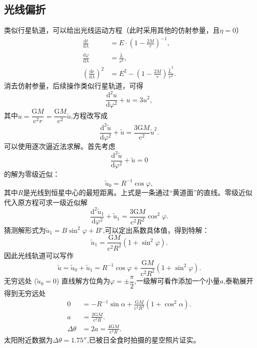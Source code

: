 \documentclass[11pt, a4paper, oneside, onecolumn]{ctexart}
\numberwithin{equation}{subsection}
\begin{document}
\subsection{光线偏折}
类似行星轨道，可以给出光线运动方程（此时采用其他的仿射参量，且$\eta=0$）
\begin{align}
\frac{\mathrm{d}t}{\mathrm{d}\lambda}&=E\cdot\left(1-\frac{2M}{r}\right)^{-1},\\
\frac{\mathrm{d}\varphi}{\mathrm{d}\lambda}&=\frac{\widetilde{L}}{r^{2}},\\
\left(\frac{\mathrm{d}r}{\mathrm{d}\lambda}\right)^{2}&=E^{2}-\left(1-\frac{2M}{r}\right)\frac{\widetilde{L}^{2}}{r^{2}}.
\end{align}
消去仿射参量，后续操作类似行星轨道，可得
\begin{equation}
\frac{\mathrm{d}^{2}u}{\mathrm{d}\varphi^{2}}+u=3u^{2},
\end{equation}
其中$u=\dfrac{\mathrm{G}M}{\mathrm{c}^{2}r}=\dfrac{\mathrm{G}M}{\mathrm{c}^{2}}\widetilde{u}$,方程改写成
\begin{equation}
\frac{\mathrm{d}^{2}\widetilde{u}}{\mathrm{d}\varphi^{2}}+\widetilde{u}=\frac{3\mathrm{G}M}{\mathrm{c}^{2}}\widetilde{u}^{2}.
\end{equation}
可以使用逐次逼近法求解。首先考虑
\begin{equation}
\frac{\mathrm{d}^{2}\widetilde{u}}{\mathrm{d}\varphi^{2}}+\widetilde{u}=0
\end{equation}
的解为零级近似：
\begin{equation}
\widetilde{u}_{0}=R^{-1}\cos\varphi,
\end{equation}
其中$R$是光线到恒星中心的最短距离。上式是一条通过“黄道面”的直线。零级近似代入原方程可求一级近似解
\begin{equation}
\frac{\mathrm{d}^{2}\widetilde{u}_{1}}{\mathrm{d}\varphi^{2}}+\widetilde{u}_{1}=\frac{3\mathrm{G}M}{\mathrm{c}^{2}R^{2}}\cos^{2}\varphi.
\end{equation}
猜测解形式为$\widetilde{u}_{1}=B\sin^{2}\varphi+B'$,可以定出系数具体值，得到特解：
\begin{equation}
\widetilde{u}_{1}=\frac{\mathrm{G}M}{\mathrm{c}^{2}R^{2}}\left(1+\sin^{2}\varphi\right).
\end{equation}
因此光线轨道可以写作
\begin{equation}
\widetilde{u}=\widetilde{u}_{0}+\widetilde{u}_{1}=R^{-1}\cos\varphi+\frac{\mathrm{G}M}{\mathrm{c}^{2}R^{2}}\left(1+\sin^{2}\varphi\right).
\end{equation}
无穷远处 ($\widetilde{u}_{0}=0$) 直线解方位角为$\varphi=\pm\dfrac{\pi}{2}$,一级解可看作添加一个小量$a$,泰勒展开得到无穷远处
\begin{align}
0&=-R^{-1}\sin\alpha+\frac{\mathrm{G}M}{\mathrm{c}^{2}R^{2}}\left(1+\cos^{2}\alpha\right).\\
a&=\frac{2\mathrm{G}M}{\mathrm{c}^{2}R}.\\
\Delta{}\theta&=2a=\frac{4\mathrm{G}M}{\mathrm{c}^{2}R}.
\end{align}
太阳附近数据为$\Delta{}\theta=\ang{;;1.75}$,已被日全食时拍摄的星空照片证实。

\printbibliography
\end{document}
